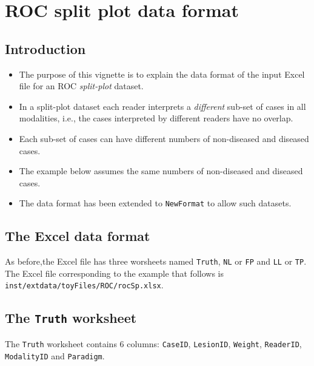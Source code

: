 \documentclass[
]{book}
\providecommand{\tightlist}{%
  \setlength{\itemsep}{0pt}\setlength{\parskip}{0pt}}
\begin{document}
\hypertarget{rocSpdataformat}{%
\chapter{ROC split plot data format}\label{rocSpdataformat}}

\hypertarget{introduction-2}{%
\section{Introduction}\label{introduction-2}}

\begin{itemize}
\tightlist
\item
  The purpose of this vignette is to explain the data format of the input Excel file for an ROC \emph{split-plot} dataset.
\item
  In a split-plot dataset each reader interprets a \emph{different} sub-set of cases in all modalities, i.e., the cases interpreted by different readers have no overlap.
\item
  Each sub-set of cases can have different numbers of non-diseased and diseased cases.
\item
  The example below assumes the same numbers of non-diseased and diseased cases.
\item
  The data format has been extended to \texttt{NewFormat} to allow such datasets.
\end{itemize}

\hypertarget{the-excel-data-format-2}{%
\section{The Excel data format}\label{the-excel-data-format-2}}

As before,the Excel file has three worsheets named \texttt{Truth}, \texttt{NL} or \texttt{FP} and \texttt{LL} or \texttt{TP}. The Excel file corresponding to the example that follows is \texttt{inst/extdata/toyFiles/ROC/rocSp.xlsx}.

\hypertarget{the-truth-worksheet-2}{%
\section{\texorpdfstring{The \texttt{Truth} worksheet}{The Truth worksheet}}\label{the-truth-worksheet-2}}

The \texttt{Truth} worksheet contains 6 columns: \texttt{CaseID}, \texttt{LesionID}, \texttt{Weight}, \texttt{ReaderID}, \texttt{ModalityID} and \texttt{Paradigm}.
\end{document}
